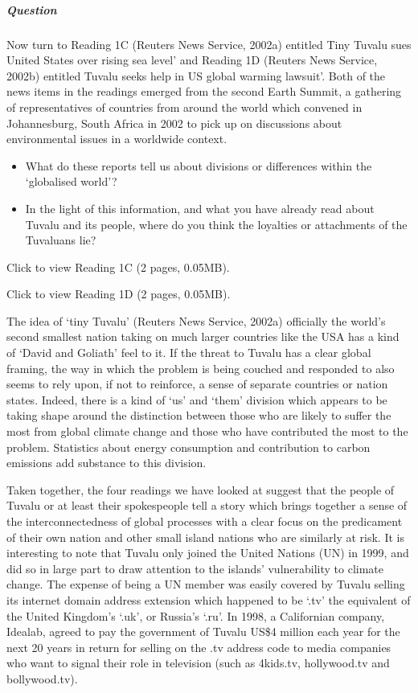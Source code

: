 \documentclass[letterpaper,10pt,english]{sphinxmanual}
\begin{document}
\subparagraph{Question}
\label{\detokenize{content/session_00/Part_00_02:id1}}
Now turn to Reading 1C (Reuters News Service, 2002a) entitled Tiny Tuvalu sues United States over rising sea level’ and Reading 1D (Reuters News Service, 2002b) entitled Tuvalu seeks help in US global warming lawsuit’. Both of the news items in the readings emerged from the second Earth Summit, a gathering of representatives of countries from around the world which convened in Johannesburg, South Africa in 2002 to pick up on discussions about environmental issues in a worldwide context.
\begin{itemize}
\item {} 
What do these reports tell us about divisions or differences within the ‘globalised world’?

\item {} 
In the light of this information, and what you have already read about Tuvalu and its people, where do you think the loyalties or attachments of the Tuvaluans lie?

\end{itemize}

Click to view Reading 1C (2 pages, 0.05MB).

Click to view Reading 1D (2 pages, 0.05MB).

The idea of ‘tiny Tuvalu’ (Reuters News Service, 2002a) \textendash{} officially the world’s second smallest nation \textendash{} taking on much larger countries like the USA has a kind of ‘David and Goliath’ feel to it. If the threat to Tuvalu has a clear global framing, the way in which the problem is being couched and responded to also seems to rely upon, if not to reinforce, a sense of separate countries or nation states. Indeed, there is a kind of ‘us’ and ‘them’ division which appears to be taking shape around
the distinction between those who are likely to suffer the most from global climate change and those who have contributed the most to the problem. Statistics about energy consumption and contribution to carbon emissions add substance to this division.

Taken together, the four readings we have looked at suggest that the people of Tuvalu \textendash{} or at least their spokespeople \textendash{} tell a story which brings together a sense of the interconnectedness of global processes with a clear focus on the predicament of their own nation and other small island nations who are similarly at risk. It is interesting to note that Tuvalu only joined the United Nations (UN) in 1999, and did so in large part to draw attention to the islands’ vulnerability to climate change.
The expense of being a UN member was easily covered by Tuvalu selling its internet domain address extension \textendash{} which happened to be ‘.tv’ \textendash{} the equivalent of the United Kingdom’s ‘.uk’, or Russia’s ‘.ru’. In 1998, a Californian company, Idealab, agreed to pay the government of Tuvalu US\$4 million each year for the next 20 years in return for selling on the .tv address code to media companies who want to signal their role in television (such as 4kids.tv, hollywood.tv and bollywood.tv).
\end{document}
